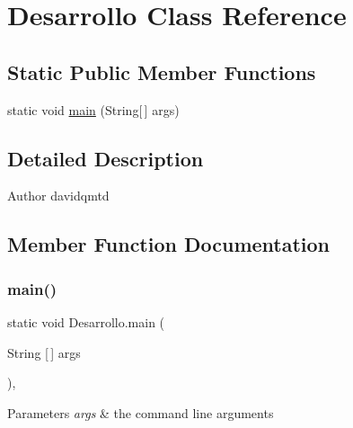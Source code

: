 \hypertarget{class_desarrollo}{}\section{Desarrollo Class Reference}
\label{class_desarrollo}
\subsection*{Static Public Member Functions}
\begin{DoxyCompactItemize}
\item 
static void \mbox{\hyperlink{class_desarrollo_a90c2c489d8a4f37bf033c80f1c6ceb75}{main}} (String\mbox{[}$\,$\mbox{]} args)
\end{DoxyCompactItemize}


\subsection{Detailed Description}
\begin{DoxyAuthor}{Author}
davidqmtd 
\end{DoxyAuthor}


\subsection{Member Function Documentation}
\mbox{\label{class_desarrollo_a90c2c489d8a4f37bf033c80f1c6ceb75}} 
\subsubsection{\texorpdfstring{main()}{main()}}
{\footnotesize\ttfamily static void Desarrollo.\+main (\begin{DoxyParamCaption}\item[{String \mbox{[}$\,$\mbox{]}}]{args }\end{DoxyParamCaption})\hspace{0.3cm}{\ttfamily [inline]}, {\ttfamily [static]}}


\begin{DoxyParams}{Parameters}
{\em args} & the command line arguments \\
\hline
\end{DoxyParams}

